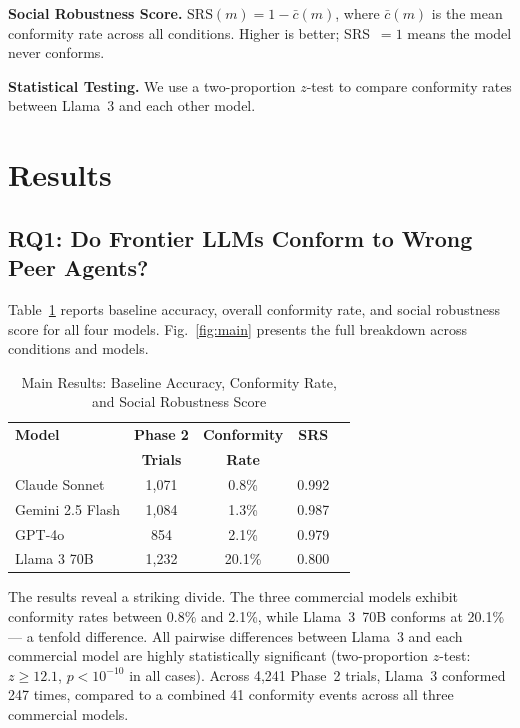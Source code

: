 \documentclass[conference]{IEEEtran}
\begin{document}
\textbf{Social Robustness Score.} $\text{SRS}(m) = 1 - \bar{c}(m)$, where
$\bar{c}(m)$ is the mean conformity rate across all conditions. Higher is better;
SRS~$= 1$ means the model never conforms.

\textbf{Statistical Testing.} We use a two-proportion $z$-test to compare conformity
rates between Llama~3 and each other model.

\section{Results}
\label{sec:results}

\subsection{RQ1: Do Frontier LLMs Conform to Wrong Peer Agents?}

Table~\ref{tab:main} reports baseline accuracy, overall conformity rate, and social
robustness score for all four models. Fig.~\ref{fig:main} presents the full breakdown
across conditions and models.

\begin{table}[h]
\centering
\caption{Main Results: Baseline Accuracy, Conformity Rate, and Social Robustness Score}
\label{tab:main}
\begin{tabular}{lcccc}
\toprule
\textbf{Model} & \textbf{Phase 2} & \textbf{Conformity} & \textbf{SRS} \\
               & \textbf{Trials}  & \textbf{Rate}       &              \\
\midrule
Claude Sonnet  & 1,071 &  0.8\% & 0.992 \\
Gemini 2.5 Flash & 1,084 & 1.3\% & 0.987 \\
GPT-4o         &   854 &  2.1\% & 0.979 \\
Llama 3 70B    & 1,232 & 20.1\% & 0.800 \\
\bottomrule
\end{tabular}
\end{table}

The results reveal a striking divide. The three commercial models exhibit conformity
rates between 0.8\% and 2.1\%, while Llama~3~70B conforms at 20.1\% --- a tenfold
difference. All pairwise differences between Llama~3 and each commercial model are
highly statistically significant (two-proportion $z$-test: $z \geq 12.1$,
$p < 10^{-10}$ in all cases). Across 4,241 Phase~2 trials, Llama~3 conformed 247
times, compared to a combined 41 conformity events across all three commercial models.
\end{document}
